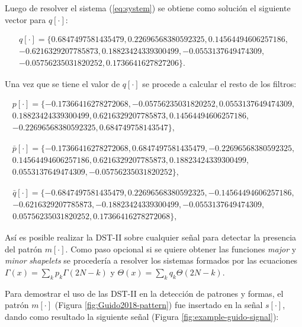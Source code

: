Luego de resolver el sistema (\ref{eq:system}) se obtiene como solución el siguiente vector para $q[\cdot]$:

$$
	\begin{array}{lcl}
		q[\cdot] = \{ 0.6847497581435479, 0.22696568380592325, 0.14564494606257186,  \\ 
					-0.6216329207785873, 0.18823424339300499, -0.0553137649474309, \\ 
					-0.05756235031820252, 0.1736641627827206 \}.
	\end{array}
$$

Una vez que se tiene el valor de $q[\cdot]$ se procede a calcular el resto de los filtros:

$$
	\begin{array}{lcl}
		p[\cdot] = \{  -0.17366416278272068, -0.05756235031820252, 0.0553137649474309, \\ 
					0.18823424339300499, 0.6216329207785873, 0.14564494606257186, \\
					-0.22696568380592325, 0.684749758143547\},
	\end{array}
$$

$$
	\begin{array}{lcl}
		\bar p[\cdot] = \{ -0.17366416278272068, 0.6847497581435479, -0.22696568380592325, \\ 
							0.14564494606257186, 0.6216329207785873, 0.18823424339300499, \\ 
							0.0553137649474309, -0.05756235031820252 \},
	\end{array}
$$

$$
	\begin{array}{lcl}
		\bar q[\cdot] = \{ -0.6847497581435479, 0.22696568380592325, -0.14564494606257186,\\
			-0.6216329207785873, -0.18823424339300499, -0.0553137649474309, \\ 
		0.05756235031820252, 0.17366416278272068 \},
	\end{array}
$$

Así es posible realizar la DST-II sobre cualquier señal para detectar la presencia
del patrón $m[\cdot]$. Como paso opcional si se quiere obtener las funciones \textit{major} y \textit{minor}
\textit{shapelets} se procedería a resolver los sistemas formados por las ecuaciones  $\Gamma(x)=\sum_k p_k \Gamma(2N-k)$ y 
$\Theta(x)=\sum_k q_k \Theta(2N-k)$.

Para demostrar el uso de las DST-II en la detección de patrones y formas, el patrón $m[\cdot]$ (Figura \ref{fig:Guido2018-pattern}) 
fue insertado en la señal $s[\cdot]$, dando como resultado la siguiente señal (Figura \ref{fig:example-guido-signal}):

